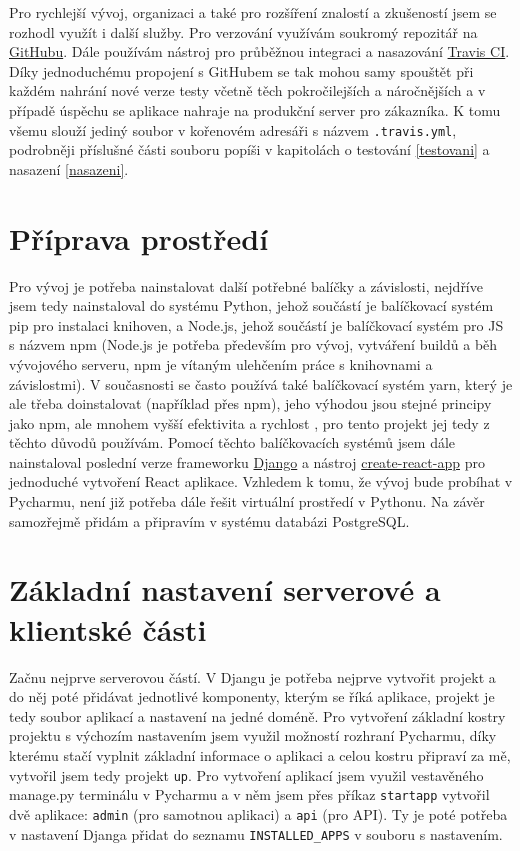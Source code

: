     Pro rychlejší vývoj, organizaci a také pro rozšíření znalostí a zkušeností jsem se rozhodl využít i další služby. Pro verzování využívám soukromý repozitář na \href{https://github.com/}{GitHubu}. Dále používám nástroj pro průběžnou integraci a nasazování \href{https://travis-ci.com/}{Travis CI}. Díky jednoduchému propojení s GitHubem se tak mohou samy spouštět při každém nahrání nové verze testy včetně těch pokročilejších a náročnějších a v případě úspěchu se aplikace nahraje na produkční server pro zákazníka. K tomu všemu slouží jediný soubor v kořenovém adresáři s názvem \verb|.travis.yml|, podrobněji příslušné části souboru popíši v kapitolách o testování \ref{testovani} a nasazení \ref{nasazeni}.
    
    \section{Příprava prostředí}
    Pro vývoj je potřeba nainstalovat další potřebné balíčky a závislosti, nejdříve jsem tedy nainstaloval do systému Python, jehož součástí je balíčkovací systém pip pro instalaci knihoven, a Node.js, jehož součástí je balíčkovací systém pro JS s názvem npm (Node.js je potřeba především pro vývoj, vytváření buildů a běh vývojového serveru, npm je vítaným ulehčením práce s knihovnami a závislostmi). V současnosti se často používá také balíčkovací systém yarn, který je ale třeba doinstalovat (například přes npm), jeho výhodou jsou stejné principy jako npm, ale mnohem vyšší efektivita a rychlost \cite{yarn}, pro tento projekt jej tedy z těchto důvodů používám. Pomocí těchto balíčkovacích systémů jsem dále nainstaloval poslední verze frameworku \href{https://www.djangoproject.com/}{Django} a nástroj \href{https://github.com/facebook/create-react-app}{create-react-app} pro jednoduché vytvoření React aplikace. Vzhledem k tomu, že vývoj bude probíhat v Pycharmu, není již potřeba dále řešit virtuální prostředí v Pythonu. Na závěr samozřejmě přidám a připravím v systému databázi PostgreSQL.
    
    \section{Základní nastavení serverové a klientské části}\label{zakladninastaveni}
    Začnu nejprve serverovou částí. V Djangu je potřeba nejprve vytvořit projekt a do něj poté přidávat jednotlivé komponenty, kterým se říká aplikace, projekt je tedy soubor aplikací a nastavení na jedné doméně. Pro vytvoření základní kostry projektu s výchozím nastavením jsem využil možností rozhraní Pycharmu, díky kterému stačí vyplnit základní informace o aplikaci a celou kostru připraví za mě, vytvořil jsem tedy projekt \verb|up|. Pro vytvoření aplikací jsem využil vestavěného manage.py terminálu v Pycharmu a v něm jsem přes příkaz \verb|startapp| vytvořil dvě aplikace: \verb|admin| (pro samotnou aplikaci) a \verb|api| (pro API). Ty je poté potřeba v nastavení Djanga přidat do seznamu \verb|INSTALLED_APPS| v souboru s nastavením.
    
